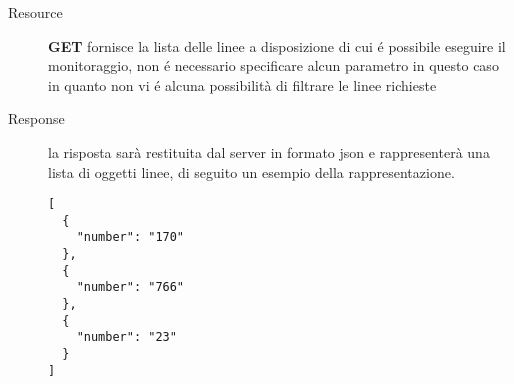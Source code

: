 \begin{description}
	\item[Resource] \textbf{GET \lines} fornisce la lista delle linee a disposizione di cui é possibile eseguire il monitoraggio, non é necessario specificare alcun parametro in questo caso in quanto non vi é alcuna possibilità di filtrare le linee richieste
	\item[Response] la risposta sarà restituita dal server in formato json e rappresenterà una lista di oggetti linee, di seguito un esempio della rappresentazione.

	\begin{verbatim}
[
  {
    "number": "170"
  },
  {
    "number": "766"
  },
  {
    "number": "23"
  }
]
	\end{verbatim}
\end{description}